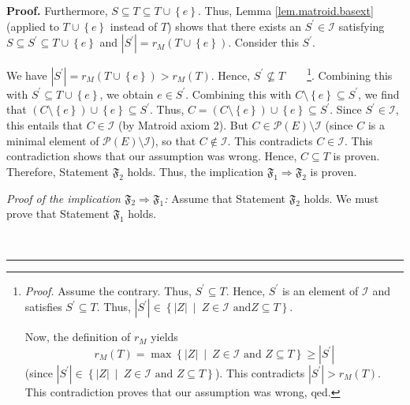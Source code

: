 \documentclass[numbers=enddot,12pt,final,onecolumn,notitlepage]{scrartcl}%
\theoremstyle{definition}
\newenvironment{proof}[1][Proof]{\noindent\textbf{#1.} }{\ \rule{0.5em}{0.5em}}
\begin{document}
\begin{proof}
Furthermore, $S\subseteq T\subseteq T\cup\left\{  e\right\}  $. Thus, Lemma
\ref{lem.matroid.basext} (applied to $T\cup\left\{  e\right\}  $ instead of
$T$) shows that there exists an $S^{\prime}\in\mathcal{I}$ satisfying
$S\subseteq S^{\prime}\subseteq T\cup\left\{  e\right\}  $ and $\left\vert
S^{\prime}\right\vert =r_{M}\left(  T\cup\left\{  e\right\}  \right)  $.
Consider this $S^{\prime}$.

We have $\left\vert S^{\prime}\right\vert =r_{M}\left(  T\cup\left\{
e\right\}  \right)  >r_{M}\left(  T\right)  $. Hence, $S^{\prime
}\not \subseteq T$\ \ \ \ \footnote{\textit{Proof.} Assume the contrary. Thus,
$S^{\prime}\subseteq T$. Hence, $S^{\prime}$ is an element of $\mathcal{I}$
and satisfies $S^{\prime}\subseteq T$. Thus, $\left\vert S^{\prime}\right\vert
\in\left\{  \left\vert Z\right\vert \ \mid\ Z\in\mathcal{I}\text{ and
}Z\subseteq T\right\}  $.
\par
Now, the definition of $r_{M}$ yields%
\[
r_{M}\left(  T\right)  =\max\left\{  \left\vert Z\right\vert \ \mid
\ Z\in\mathcal{I}\text{ and }Z\subseteq T\right\}  \geq\left\vert S^{\prime
}\right\vert
\]
(since $\left\vert S^{\prime}\right\vert \in\left\{  \left\vert Z\right\vert
\ \mid\ Z\in\mathcal{I}\text{ and }Z\subseteq T\right\}  $). This contradicts
$\left\vert S^{\prime}\right\vert >r_{M}\left(  T\right)  $. This
contradiction proves that our assumption was wrong, qed.}. Combining this with
$S^{\prime}\subseteq T\cup\left\{  e\right\}  $, we obtain $e\in S^{\prime}$.
Combining this with $C\setminus\left\{  e\right\}  \subseteq S^{\prime}$, we
find that $\left(  C\setminus\left\{  e\right\}  \right)  \cup\left\{
e\right\}  \subseteq S^{\prime}$. Thus, $C=\left(  C\setminus\left\{
e\right\}  \right)  \cup\left\{  e\right\}  \subseteq S^{\prime}$. Since
$S^{\prime}\in\mathcal{I}$, this entails that $C\in\mathcal{I}$ (by Matroid
axiom 2). But $C\in\mathcal{P}\left(  E\right)  \setminus\mathcal{I}$ (since
$C$ is a minimal element of $\mathcal{P}\left(  E\right)  \setminus
\mathcal{I}$), so that $C\notin\mathcal{I}$. This contradicts $C\in
\mathcal{I}$. This contradiction shows that our assumption was wrong. Hence,
$C\subseteq T$ is proven. Therefore, Statement $\mathfrak{F}_{2}$ holds. Thus,
the implication $\mathfrak{F}_{1}\Longrightarrow\mathfrak{F}_{2}$ is proven.

\textit{Proof of the implication $\mathfrak{F}$}$_{2}\Longrightarrow
\mathfrak{F}_{1}$\textit{:} Assume that Statement $\mathfrak{F}_{2}$ holds. We
must prove that Statement $\mathfrak{F}_{1}$ holds.


\end{proof}
\end{document}
